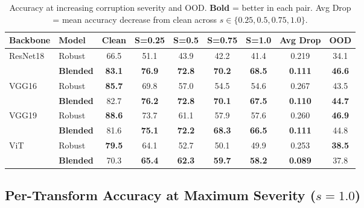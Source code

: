 \documentclass[11pt,a4paper]{article}
\begin{document}
\begin{table}[H]
\centering
\caption{Accuracy at increasing corruption severity and OOD. \textbf{Bold} = better in each pair. Avg Drop = mean accuracy decrease from clean across $s \in \{0.25, 0.5, 0.75, 1.0\}$.}
\label{tab:overall}
\begin{tabular}{llccccccc}
\toprule
\textbf{Backbone} & \textbf{Model} & \textbf{Clean} & \textbf{S=0.25} & \textbf{S=0.5} & \textbf{S=0.75} & \textbf{S=1.0} & \textbf{Avg Drop} & \textbf{OOD} \\
\midrule
\multirow{2}{*}{ResNet18}
 & Robust  & 66.5 & 51.1 & 43.9 & 42.2 & 41.4 & 0.219 & 34.1 \\
 & \textbf{Blended} & \textbf{83.1} & \textbf{76.9} & \textbf{72.8} & \textbf{70.2} & \textbf{68.5} & \textbf{0.111} & \textbf{46.6} \\
\midrule
\multirow{2}{*}{VGG16}
 & Robust  & \textbf{85.7} & 69.8 & 57.0 & 54.5 & 54.6 & 0.267 & 43.5 \\
 & \textbf{Blended} & 82.7 & \textbf{76.2} & \textbf{72.8} & \textbf{70.1} & \textbf{67.5} & \textbf{0.110} & \textbf{44.7} \\
\midrule
\multirow{2}{*}{VGG19}
 & Robust  & \textbf{88.6} & 73.7 & 61.1 & 57.9 & 57.6 & 0.260 & \textbf{46.9} \\
 & \textbf{Blended} & 81.6 & \textbf{75.1} & \textbf{72.2} & \textbf{68.3} & \textbf{66.5} & \textbf{0.111} & 44.8 \\
\midrule
\multirow{2}{*}{ViT}
 & Robust  & \textbf{79.5} & 64.1 & 52.7 & 50.1 & 49.9 & 0.253 & \textbf{38.5} \\
 & \textbf{Blended} & 70.3 & \textbf{65.4} & \textbf{62.3} & \textbf{59.7} & \textbf{58.2} & \textbf{0.089} & 37.8 \\
\bottomrule
\end{tabular}
\end{table}

\subsection{Per-Transform Accuracy at Maximum Severity ($s = 1.0$)}
\end{document}
